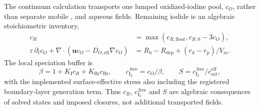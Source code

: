 \documentclass[11pt]{article}
\newcommand{\csat}{c_{\mathrm{sat}}}
\newcommand{\cf}{c_{\mathrm{I_2}}^{\,\mathrm{free}}}
\begin{document}
The continuum calculation transports one lumped oxidized-iodine pool, $c_O$, rather than separate mobile
,  and aqueous  fields. Remaining iodide is an algebraic stoichiometric inventory,
\begin{align}
c_R&=\max(c_{R,\mathrm{floor}},c_{R,0}-3c_O),\\
\varepsilon\,\partial_t c_O+\nabla\!\cdot(\mathbf{u}c_O-D_{O,\mathrm{eff}}\nabla c_O)
&=R_{\mathrm b}-R_{\mathrm{dep}}+(r_{\mathrm d}-r_{\mathrm p})/V_m .
\label{eq:species}
\end{align}
The local speciation buffer is
\begin{equation}
\beta=1+K_{\mathrm I}c_R+K_{\mathrm{Br}}c_{\mathrm{Br}},\qquad
\cf=c_O/\beta,\qquad S=\cf/\csat^{\mathrm{eff}},
\label{eq:speciation}
\end{equation}
with the implemented surface-effective stress also including the registered boundary-layer generation term.
Thus $c_R$, $\cf$ and $S$ are algebraic consequences of solved states and imposed closures, not additional
transported fields.
\end{document}
